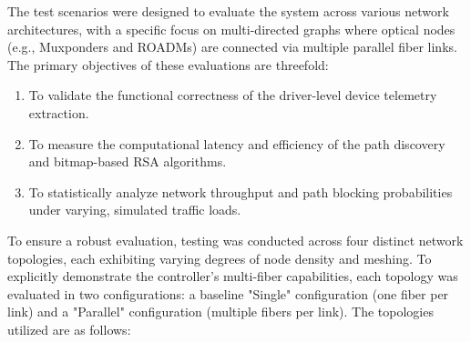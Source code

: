 The test scenarios were designed to evaluate the system across various network architectures, with a specific focus on multi-directed graphs where optical nodes (e.g., Muxponders and ROADMs) are connected via multiple parallel fiber links. The primary objectives of these evaluations are threefold:
\begin{enumerate}
    \item To validate the functional correctness of the driver-level device telemetry extraction.
    \item To measure the computational latency and efficiency of the path discovery and bitmap-based RSA algorithms.
    \item To statistically analyze network throughput and path blocking probabilities under varying, simulated traffic loads.
\end{enumerate}
To ensure a robust evaluation, testing was conducted across four distinct network topologies, each exhibiting varying degrees of node density and meshing. To explicitly demonstrate the controller's multi-fiber capabilities, each topology was evaluated in two configurations: a baseline "Single" configuration (one fiber per link) and a "Parallel" configuration (multiple fibers per link). The topologies utilized are as follows:
